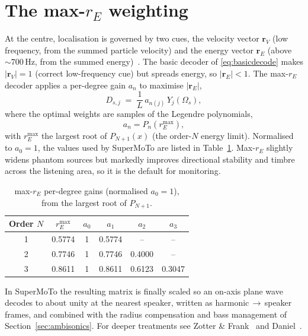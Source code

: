 \section{The max-\texorpdfstring{\(r_E\)}{rE} weighting}
At the centre, localisation is governed by two cues, the velocity vector \(\mathbf r_V\) (low frequency, from the summed particle velocity) and the energy vector \(\mathbf r_E\) (above \(\sim\!700\,\)Hz, from the summed energy)~\cite{Daniel2000,ZotterFrank2019}. The basic decoder of \eqref{eq:basicdecode} makes \(|\mathbf r_V|=1\) (correct low-frequency cue) but spreads energy, so \(|\mathbf r_E|<1\). The max-\(r_E\) decoder applies a per-degree gain \(a_n\) to maximise \(|\mathbf r_E|\),
\begin{equation}
  D_{s,j} \;=\; \frac{1}{L}\,a_{n(j)}\,Y_j(\Omega_s),
\end{equation}
where the optimal weights are samples of the Legendre polynomials,
\begin{equation}
  a_n = P_n\!\left(r_E^{\max}\right),
\end{equation}
with \(r_E^{\max}\) the largest root of \(P_{N+1}(x)\) (the order-\(N\) energy limit). Normalised to \(a_0=1\), the values used by SuperMoTo are listed in Table~\ref{tab:maxre}. Max-\(r_E\) slightly widens phantom sources but markedly improves directional stability and timbre across the listening area, so it is the default for monitoring.

\begin{table}[ht]
\centering
\renewcommand{\arraystretch}{1.2}
\begin{tabular}{cccccc}
\toprule
Order \(N\) & \(r_E^{\max}\) & \(a_0\) & \(a_1\) & \(a_2\) & \(a_3\)\\
\midrule
1 & 0.5774 & 1 & 0.5774 & --     & --\\
2 & 0.7746 & 1 & 0.7746 & 0.4000 & --\\
3 & 0.8611 & 1 & 0.8611 & 0.6123 & 0.3047\\
\bottomrule
\end{tabular}
\caption{max-\(r_E\) per-degree gains (normalised \(a_0=1\)), from the largest
root of \(P_{N+1}\).}
\label{tab:maxre}
\end{table}

In SuperMoTo the resulting matrix is finally scaled so an on-axis plane wave decodes to about unity at the nearest speaker, written as harmonic\,\(\rightarrow\)\,speaker frames, and combined with the radius compensation and bass management of Section~\ref{sec:ambisonics}. For deeper treatments see Zotter \& Frank~\cite{ZotterFrank2019} and Daniel~\cite{Daniel2000}.
